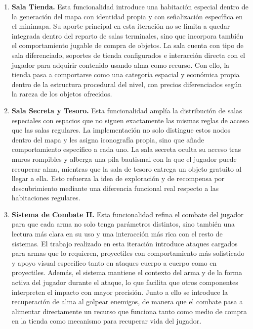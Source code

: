 \begin{enumerate}
\item \textbf{Sala Tienda.} Esta funcionalidad introduce una habitación especial dentro
de la generación del mapa con identidad propia y con señalización específica en el minimapa.
Su aporte principal en esta iteración no se limita a quedar integrada dentro del reparto de
salas terminales, sino que incorpora también el comportamiento jugable de compra de objetos.
La sala cuenta con tipo de sala diferenciado, soportes de tienda configurados e interacción
directa con el jugador para adquirir contenido usando alma como recurso. Con ello, la tienda
pasa a comportarse como una categoría espacial y económica propia dentro de la estructura
procedural del nivel, con precios diferenciados según la rareza de los objetos ofrecidos.

\item \textbf{Sala Secreta y Tesoro.} Esta funcionalidad amplía la distribución de salas
especiales con espacios que no siguen exactamente las mismas reglas de acceso que las salas
regulares. La implementación no solo distingue estos nodos dentro del mapa y les asigna
iconografía propia, sino que añade comportamiento específico a cada uno. La sala secreta
oculta su acceso tras muros rompibles y alberga una pila bautismal con la que el jugador
puede recuperar alma, mientras que la sala de tesoro entrega un objeto gratuito al llegar a
ella. Esto refuerza la idea de exploración y de recompensa por descubrimiento mediante una
diferencia funcional real respecto a las habitaciones regulares.

\item \textbf{Sistema de Combate II.} Esta funcionalidad refina el combate del jugador para
que cada arma no solo tenga parámetros distintos, sino también una lectura más clara en su
uso y una interacción más rica con el resto de sistemas. El trabajo realizado en esta
iteración introduce ataques cargados para armas que lo requieren, proyectiles con
comportamiento más sofisticado y apoyo visual específico tanto en ataques cuerpo a cuerpo
como en proyectiles. Además, el sistema mantiene el contexto del arma y de la forma activa
del jugador durante el ataque, lo que facilita que otros componentes interpreten el impacto
con mayor precisión. Junto a ello se introduce la recuperación de alma al golpear enemigos,
de manera que el combate pasa a alimentar directamente un recurso que funciona tanto como
medio de compra en la tienda como mecanismo para recuperar vida del jugador.


\end{enumerate}
